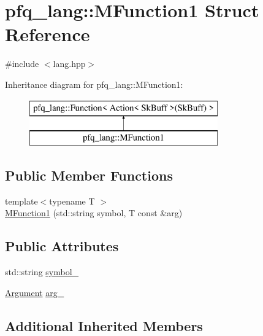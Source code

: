 \hypertarget{structpfq__lang_1_1MFunction1}{\section{pfq\+\_\+lang\+:\+:M\+Function1 Struct Reference}
\label{structpfq__lang_1_1MFunction1}
}


{\ttfamily \#include $<$lang.\+hpp$>$}

Inheritance diagram for pfq\+\_\+lang\+:\+:M\+Function1\+:\begin{figure}[H]
\begin{center}
\leavevmode
\includegraphics[height=2.000000cm]{structpfq__lang_1_1MFunction1}
\end{center}
\end{figure}
\subsection*{Public Member Functions}
\begin{DoxyCompactItemize}
\item 
{\footnotesize template$<$typename T $>$ }\\\hyperlink{structpfq__lang_1_1MFunction1_aacf9e776abdfd49513ce6bcc6a5315ac}{M\+Function1} (std\+::string symbol, T const \&arg)
\end{DoxyCompactItemize}
\subsection*{Public Attributes}
\begin{DoxyCompactItemize}
\item 
std\+::string \hyperlink{structpfq__lang_1_1MFunction1_a742ffe5f58b94f85b6ddaa8f7c04e02d}{symbol\+\_\+}
\item 
\hyperlink{structpfq__lang_1_1Argument}{Argument} \hyperlink{structpfq__lang_1_1MFunction1_ab6f349bca9961d255f2daf25bc975635}{arg\+\_\+}
\end{DoxyCompactItemize}
\subsection*{Additional Inherited Members}



